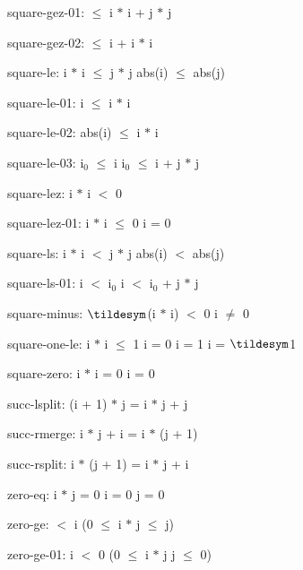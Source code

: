 \documentclass[a4paper]{article}
\begin{document}
\item	square-gez-01:   $\le$ i $*$ i + j $*$ j

\item	square-gez-02:   $\le$ i + i $*$ i

\item	square-le:  \Fol i $*$ i $\le$ j $*$ j \Equiv abs(i) $\le$ abs(j)

\item	square-le-01:  \Fol i $\le$ i $*$ i

\item	square-le-02:  \Fol abs(i) $\le$ i $*$ i

\item	square-le-03:  \Fol $\mbox{i}_{0}$ $\le$ i \Imp $\mbox{i}_{0}$ $\le$ i + j $*$ j

\item	square-lez:  \Fol \Not i $*$ i $<$ 0

\item	square-lez-01:  \Fol i $*$ i $\le$ 0 \Equiv i = 0

\item	square-ls:  \Fol i $*$ i $<$ j $*$ j \Equiv abs(i) $<$ abs(j)

\item	square-ls-01:  \Fol i $<$ $\mbox{i}_{0}$ \Imp i $<$ $\mbox{i}_{0}$ + j $*$ j

\item	square-minus:  \Fol $\tildesym$(i $*$ i) $<$ 0 \Equiv i $\neq$ 0

\item	square-one-le:  \Fol i $*$ i $\le$ 1 \Equiv i = 0 \Or i = 1 \Or i = $\tildesym$1

\item	square-zero:  \Fol i $*$ i = 0 \Equiv i = 0

\item	succ-lsplit:  \Fol (i + 1) $*$ j = i $*$ j + j

\item	succ-rmerge:  \Fol i $*$ j + i = i $*$ (j + 1)

\item	succ-rsplit:  \Fol i $*$ (j + 1) = i $*$ j + i

\item	zero-eq:  \Fol i $*$ j = 0 \Equiv i = 0 \Or j = 0

\item	zero-ge:   $<$ i \Imp (0 $\le$ i $*$ j  $\le$ j)

\item	zero-ge-01:  \Fol i $<$ 0 \Imp (0 $\le$ i $*$ j \Equiv j $\le$ 0)
\end{document}
